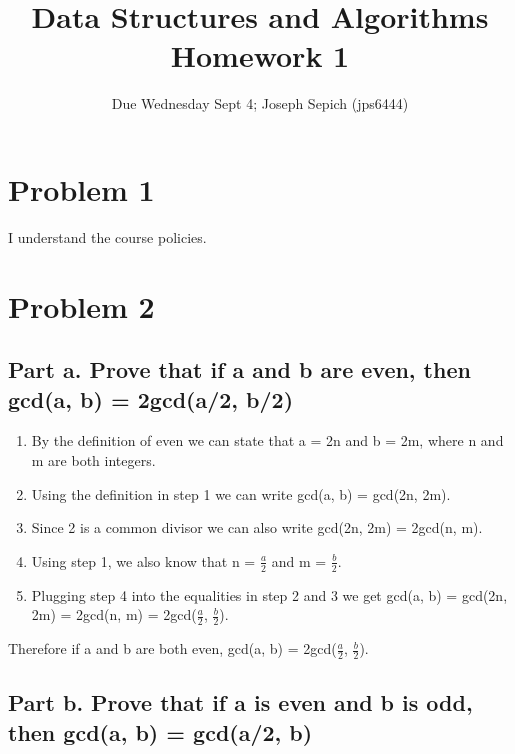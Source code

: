 \documentclass[]{article}
\title{Data Structures and Algorithms Homework 1}
\subtitle{Due Wednesday Sept 4; Joseph Sepich (jps6444)}
\author{}
\date{}
\providecommand{\tightlist}{%
  \setlength{\itemsep}{0pt}\setlength{\parskip}{0pt}}
\begin{document}
\maketitle

\section{Problem 1}\label{problem-1}

I understand the course policies.

\pagebreak

\section{Problem 2}\label{problem-2}

\subsection{Part a. Prove that if a and b are even, then gcd(a, b) =
2gcd(a/2,
b/2)}\label{part-a.-prove-that-if-a-and-b-are-even-then-gcda-b-2gcda2-b2}

\begin{enumerate}
\def\labelenumi{\arabic{enumi}.}
\tightlist
\item
  By the definition of even we can state that a = 2n and b = 2m, where n
  and m are both integers.
\item
  Using the definition in step 1 we can write gcd(a, b) = gcd(2n, 2m).
\item
  Since 2 is a common divisor we can also write gcd(2n, 2m) = 2gcd(n,
  m).
\item
  Using step 1, we also know that n = \(\frac{a}{2}\) and m =
  \(\frac{b}{2}\).
\item
  Plugging step 4 into the equalities in step 2 and 3 we get gcd(a, b) =
  gcd(2n, 2m) = 2gcd(n, m) = 2gcd(\(\frac{a}{2}\), \(\frac{b}{2}\)).
\end{enumerate}

Therefore if a and b are both even, gcd(a, b) = 2gcd(\(\frac{a}{2}\),
\(\frac{b}{2}\)).

\pagebreak

\subsection{Part b. Prove that if a is even and b is odd, then gcd(a, b)
= gcd(a/2,
b)}\label{part-b.-prove-that-if-a-is-even-and-b-is-odd-then-gcda-b-gcda2-b}
\end{document}

